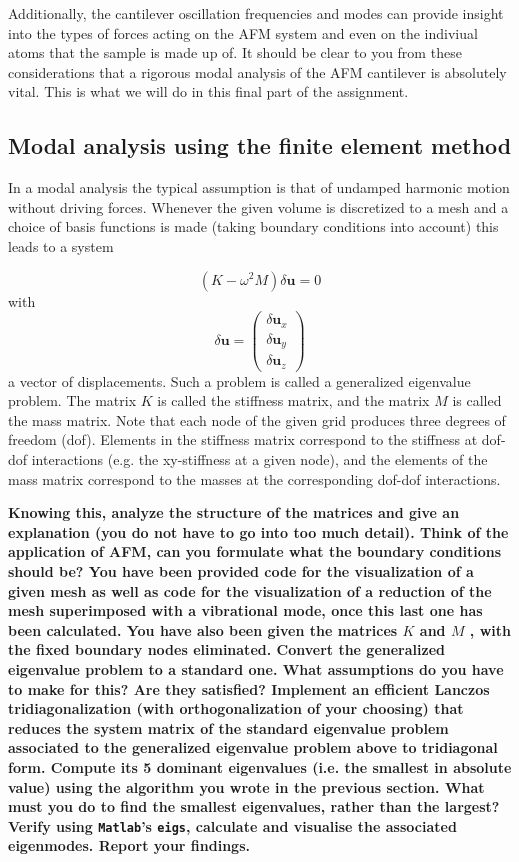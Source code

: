 \documentclass[12pt]{article}
\begin{document}
Additionally, the cantilever oscillation frequencies and modes can provide insight into the types of
forces acting on the AFM system and even on the indiviual atoms that the sample is made up of.
It should be clear to you from these considerations that a rigorous modal analysis of the AFM cantilever
is absolutely vital. This is what we will do in this final part of the assignment.
\subsection{Modal analysis using the finite element method}
In a modal analysis the typical assumption is that of undamped harmonic motion without driving
forces. Whenever the given volume is discretized to a mesh and a choice of basis functions is made
(taking boundary conditions into account) this leads to a system

$$(K - \omega^2 M)\delta \mathbf{u} = 0$$
with
$$\delta \mathbf{u}=\begin{pmatrix}
\delta \mathbf{u}_x\\
\delta \mathbf{u}_y\\
\delta \mathbf{u}_z
\end{pmatrix}$$
a vector of displacements. Such a problem is called a generalized eigenvalue problem. The matrix $K$
is called the stiffness matrix, and the matrix $M$ is called the mass matrix. Note that each node of the
given grid produces three degrees of freedom (dof). Elements in the stiffness matrix correspond to the
stiffness at dof-dof interactions (e.g. the xy-stiffness at a given node), and the elements of the mass
matrix correspond to the masses at the corresponding dof-dof interactions. 

\textbf{Knowing this, analyze the structure of the matrices and give an explanation (you do not have to go into too
much detail). Think of the application of AFM, can you formulate what the boundary
conditions should be? You have been provided code for the visualization of a given mesh as well as code for
the visualization of a reduction of the mesh superimposed with a vibrational mode, once
this last one has been calculated. You have also been given the matrices $K$ and $M$ , with
the fixed boundary nodes eliminated. Convert the generalized eigenvalue problem to a
standard one. What assumptions do you have to make for this? Are they satisfied? Implement an efficient Lanczos tridiagonalization (with orthogonalization of your choosing)
that reduces the system matrix of the standard eigenvalue problem associated to the
generalized eigenvalue problem above to tridiagonal form. Compute its 5  dominant eigenvalues (i.e. the smallest in
absolute value) using the algorithm you wrote in the previous section. What must you do to find the smallest eigenvalues, rather than the largest? Verify using \texttt{Matlab}’s \texttt{eigs}, calculate and visualise the associated eigenmodes. Report your findings.}
\end{document}
